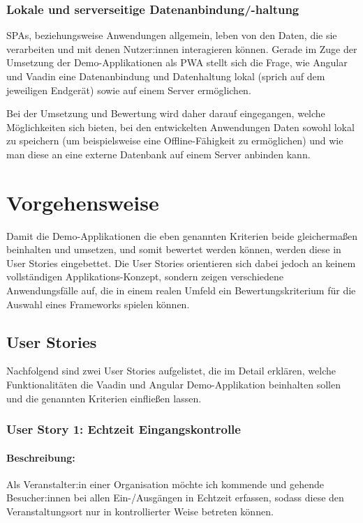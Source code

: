 \documentclass[a4paper,12pt,twoside]{scrreprt}
\begin{document}
\subsubsection*{Lokale und serverseitige Datenanbindung/-haltung}
\label{sub-sec:kriterien-datenanbindung}
\acp{SPA}, beziehungsweise Anwendungen allgemein, leben von den Daten, die sie verarbeiten und mit denen Nutzer:innen interagieren können. Gerade im Zuge der Umsetzung der Demo-Applikationen als \ac{PWA} stellt sich die Frage, wie Angular und Vaadin eine Datenanbindung und Datenhaltung lokal (sprich auf dem jeweiligen Endgerät) sowie auf einem Server ermöglichen.

Bei der Umsetzung und Bewertung wird daher darauf eingegangen, welche Möglichkeiten sich bieten, bei den entwickelten Anwendungen Daten sowohl lokal zu speichern (um beispielsweise eine Offline-Fähigkeit zu ermöglichen) und wie man diese an eine externe Datenbank auf einem Server anbinden kann.

\section{Vorgehensweise}
\label{sec:vorgehensweise}
Damit die Demo-Applikationen die eben genannten Kriterien beide gleichermaßen beinhalten und umsetzen, und somit bewertet werden können, werden diese in User Stories eingebettet. Die User Stories orientieren sich dabei jedoch an keinem vollständigen Applikations-Konzept, sondern zeigen verschiedene Anwendungsfälle auf, die in einem realen Umfeld ein Bewertungskriterium für die Auswahl eines Frameworks spielen können.

\subsection{User Stories}
\label{sub-sec:user-stories}
Nachfolgend sind zwei User Stories aufgelistet, die im Detail erklären, welche Funktionalitäten die Vaadin und Angular Demo-Applikation beinhalten sollen und die genannten Kriterien einfließen lassen.

\subsubsection*{User Story 1: Echtzeit Eingangskontrolle}
\label{sub-sub-sec:user-story-1}

\paragraph*{Beschreibung:} Als Veranstalter:in einer Organisation möchte ich kommende und gehende Besucher:innen bei allen Ein-/Ausgängen in Echtzeit erfassen, sodass diese den Veranstaltungsort nur in kontrollierter Weise betreten können.
\end{document}
